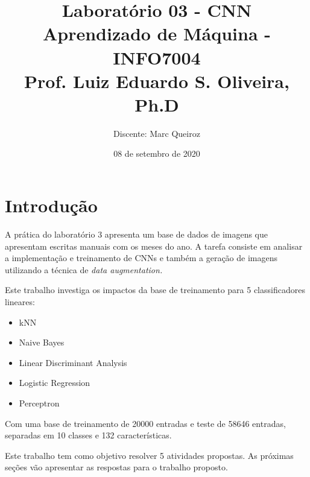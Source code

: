 \documentclass[12pt,
	english,			%
	french,				%
	spanish,			%
	brazil,				%
	]{article}
\title{Laboratório 03 - CNN\\
\Large{Aprendizado de Máquina - INFO7004}\\
\Large{Prof. Luiz Eduardo S. Oliveira, Ph.D}}
\author{Discente: Marc Queiroz}
\date{08 de setembro de 2020}
\begin{document}
\maketitle




\section{Introdução}

A prática do laboratório 3 apresenta um base de dados de imagens que apresentam escritas manuais com os meses do ano. A tarefa consiste em analisar a implementação e treinamento de CNNs e também a geração de imagens utilizando a técnica de \it{data augmentation}.

Este trabalho investiga os impactos da base de treinamento para 5 classificadores lineares:

\begin{itemize}
    \item kNN
    \item Naive Bayes
    \item Linear Discriminant Analysis
    \item Logistic Regression
    \item Perceptron
\end{itemize}

Com uma base de treinamento de 20000 entradas e teste de 58646 entradas, separadas em 10 classes e 132 características.

Este trabalho tem como objetivo resolver 5 atividades propostas. As próximas seções vão apresentar as respostas para o trabalho proposto.
\end{document}
